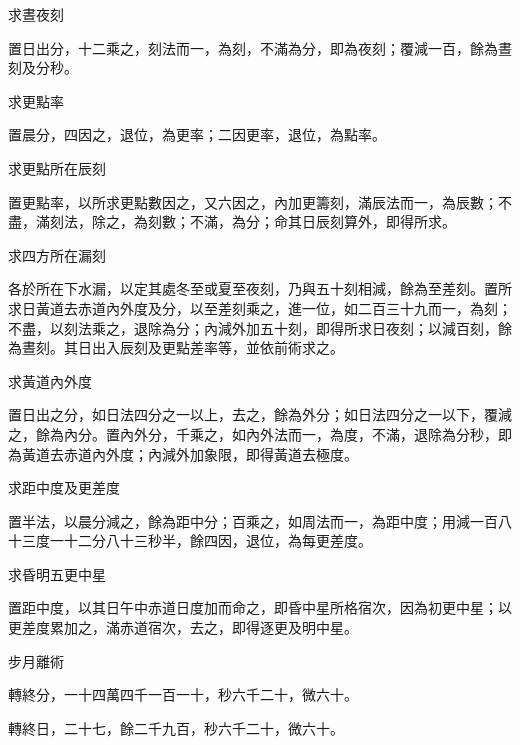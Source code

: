 \begin{pinyinscope}
 求晝夜刻



 置日出分，十二乘之，刻法而一，為刻，不滿為分，即為夜刻；覆減一百，餘為晝刻及分秒。



 求更點率



 置晨分，四因之，退位，為更率；二因更率，退位，為點率。



 求更點所在辰刻



 置更點率，以所求更點數因之，又六因之，內加更籌刻，滿辰法而一，為辰數；不盡，滿刻法，除之，為刻數；不滿，為分；命其日辰刻算外，即得所求。



 求四方所在漏刻



 各於所在下水漏，以定其處冬至或夏至夜刻，乃與五十刻相減，餘為至差刻。置所求日黃道去赤道內外度及分，以至差刻乘之，進一位，如二百三十九而一，為刻；不盡，以刻法乘之，退除為分；內減外加五十刻，即得所求日夜刻；以減百刻，餘為晝刻。其日出入辰刻及更點差率等，並依前術求之。



 求黃道內外度



 置日出之分，如日法四分之一以上，去之，餘為外分；如日法四分之一以下，覆減之，餘為內分。置內外分，千乘之，如內外法而一，為度，不滿，退除為分秒，即為黃道去赤道內外度；內減外加象限，即得黃道去極度。



 求距中度及更差度



 置半法，以晨分減之，餘為距中分；百乘之，如周法而一，為距中度；用減一百八十三度一十二分八十三秒半，餘四因，退位，為每更差度。



 求昏明五更中星



 置距中度，以其日午中赤道日度加而命之，即昏中星所格宿次，因為初更中星；以更差度累加之，滿赤道宿次，去之，即得逐更及明中星。



 步月離術



 轉終分，一十四萬四千一百一十，秒六千二十，微六十。



 轉終日，二十七，餘二千九百，秒六千二十，微六十。




\end{pinyinscope}
